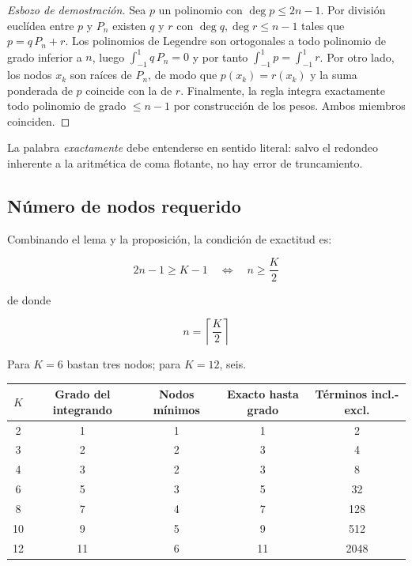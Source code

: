 \documentclass[a4paper, 12pt]{article}
\begin{document}
\begin{proof}[Esbozo de demostración]
Sea $p$ un polinomio con $\deg p \le 2n-1$. Por división euclídea entre $p$ y $P_n$ existen $q$ y $r$ con $\deg q, \deg r \le n-1$ tales que $p = q\,P_n + r$. Los polinomios de Legendre son ortogonales a todo polinomio de grado inferior a $n$, luego $\int_{-1}^1 q\,P_n = 0$ y por tanto $\int_{-1}^1 p = \int_{-1}^1 r$. Por otro lado, los nodos $x_k$ son raíces de $P_n$, de modo que $p(x_k) = r(x_k)$ y la suma ponderada de $p$ coincide con la de $r$. Finalmente, la regla integra exactamente todo polinomio de grado $\le n-1$ por construcción de los pesos. Ambos miembros coinciden.
\end{proof}

La palabra \emph{exactamente} debe entenderse en sentido literal: salvo el redondeo inherente a la aritmética de coma flotante, no hay error de truncamiento.

\subsection{Número de nodos requerido}

Combinando el lema y la proposición, la condición de exactitud es:

\begin{equation}
2n - 1 \ge K - 1 \quad \Longleftrightarrow \quad n \ge \frac{K}{2}
\end{equation}

de donde

\begin{equation}
\boxed{\;n = \left\lceil \frac{K}{2} \right\rceil\;}
\label{eq:nodos}
\end{equation}

Para $K=6$ bastan tres nodos; para $K=12$, seis.

\begin{center}
\begin{tabular}{ccccc}
\toprule
$K$ & Grado del integrando & Nodos mínimos & Exacto hasta grado & Términos incl.-excl. \\
\midrule
2 & 1 & 1 & 1 & 2 \\
3 & 2 & 2 & 3 & 4 \\
4 & 3 & 2 & 3 & 8 \\
6 & 5 & 3 & 5 & 32 \\
8 & 7 & 4 & 7 & 128 \\
10 & 9 & 5 & 9 & 512 \\
12 & 11 & 6 & 11 & 2048 \\
\bottomrule
\end{tabular}
\end{center}
\end{document}
